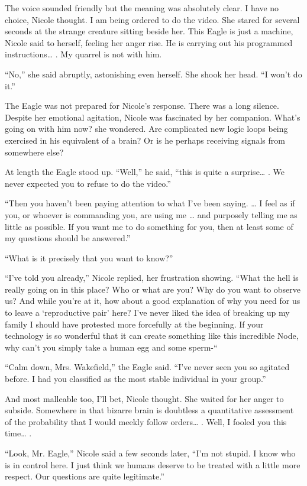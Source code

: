 \documentclass[]{article}
\begin{document}
{The voice sounded friendly but the meaning was absolutely clear. I have no choice, Nicole thought. I am being ordered to do the video. She stared for several seconds at the strange creature sitting beside her. This Eagle is just a machine, Nicole said to herself, feeling her anger rise. He is carrying out his programmed instructions… . My quarrel is not with him.

“No,” she said abruptly, astonishing even herself. She shook her head. “I won’t do it.”

The Eagle was not prepared for Nicole’s response. There was a long silence. Despite her emotional agitation, Nicole was fascinated by her companion. What’s going on with him now? she wondered. Are complicated new logic loops being exercised in his equivalent of a brain? Or is he perhaps receiving signals from somewhere else?

At length the Eagle stood up. “Well,” he said, “this is quite a surprise… . We never expected you to refuse to do the video.”

“Then you haven’t been paying attention to what I’ve been saying. … I feel as if you, or whoever is commanding you, are using me … and purposely telling me as little as possible. If you want me to do something for you, then at least some of my questions should be answered.”

“What is it precisely that you want to know?”

“I’ve told you already,” Nicole replied, her frustration showing. “What the hell is really going on in this place? Who or what are you? Why do you want to observe us? And while you’re at it, how about a good explanation of why you need for us to leave a ‘reproductive pair’ here? I’ve never liked the idea of breaking up my family I should have protested more forcefully at the beginning. If your technology is so wonderful that it can create something like this incredible Node, why can’t you simply take a human egg and some sperm-“

“Calm down, Mrs. Wakefield,” the Eagle said. “I’ve never seen you so agitated before. I had you classified as the most stable individual in your group.”

And most malleable too, I’ll bet, Nicole thought. She waited for her anger to subside. Somewhere in that bizarre brain is doubtless a quantitative assessment of the probability that I would meekly follow orders… . Well, I fooled you this time… .

“Look, Mr. Eagle,” Nicole said a few seconds later, “I’m not stupid. I know who is in control here. I just think we humans deserve to be treated with a little more respect. Our questions are quite legitimate.”

}
\end{document}
